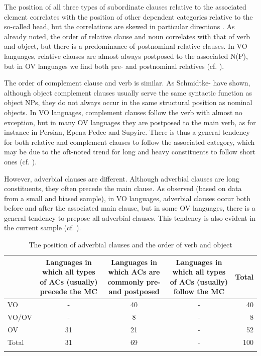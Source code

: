 \documentclass[output=paper]{langsci/langscibook}
\begin{document}
The position of all three types of subordinate clauses relative to the associated element correlates with the position of other dependent categories relative to the so-called head, but the correlations are skewed in particular directions \citep{Diessel2001}. As \citet{Greenberg1963} already noted, the order of relative clause and noun correlates with that of verb and object, but there is a predominance of postnominal relative clauses. In VO languages, relative clauses are almost always postposed to the associated N(P), but in OV languages we find both pre- and postnominal relatives (cf. \citealt{Dryer2005}). 

The order of complement clause and verb is similar. As Schmidtke-\citet{BodeDiessel2017} have shown, although object complement clauses usually serve the same syntactic function as object NPs, they do not always occur in the same structural position as nominal objects. In VO languages, complement clauses follow the verb with almost no exception, but in many OV languages they are postposed to the main verb, as for instance in Persian, Epena Pedee and Supyire. There is thus a general tendency for both relative and complement clauses to follow the associated category, which may be due to the oft-noted trend for long and heavy constituents to follow short ones (cf. \citealt{Behaghel1932}).

However, adverbial clauses are different. Although adverbial clauses are long constituents, they often precede the main clause. As \citet{Diessel2001} observed (based on data from a small and biased sample), in VO languages, adverbial clauses occur both before and after the associated main clause, but in some OV languages, there is a general tendency to prepose all adverbial clauses. This tendency is also evident in the current sample (cf. ).

\begin{table}
\small
\begin{tabularx}{\textwidth}{lSSSr}
\lsptoprule
&   Languages in which all types of ACs (usually) precede the MC &   Languages in which ACs are commonly pre- and postposed &   Languages in which all types of ACs (usually) follow the MC &   Total\\
\midrule 
VO & - & 40 & - & 40\\
VO/OV & - & 8 & - & 8\\
OV & 31 & 21 & - & 52\\
\midrule
Total & 31 & 69 & - & 100\\
\lspbottomrule
\end{tabularx}

\caption{The position of adverbial clauses and the order of verb and object}
\label{tab:diessel:1}
\end{table}
\end{document}
